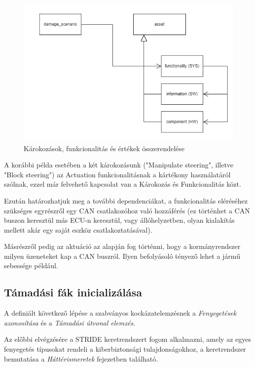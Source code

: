\begin{figure}[!ht]
	\centering
	\includegraphics[width=130mm, keepaspectratio]{figures/04_dependencies.png}
	\caption{Károkozások, funkcionalitás és értékek összerendelése}
	\label{fig:04_dependencies}
\end{figure}

A korábbi példa esetében a két károkozásunk ("Manipulate steering", illetve "Block steering") az Actuation funkcionalitásnak a kártékony használatáról szólnak, ezzel már felvehető kapcsolat van a Károkozás és Funkcionalitás közt. 

Ezután határozhatjuk meg a további dependenciákat, a funkcionalitás eléréséhez szükséges egyrészről egy CAN csatlakozóhoz való hozzáférés (ez történhet a CAN buszon keresztül más ECU-n keresztül, vagy állóhelyzetben, olyan kialakítás mellett akár egy saját eszköz csatlakoztatásával). 

Másrészről pedig az aktuáció az alapján fog történni, hogy a kormányrendszer milyen üzeneteket kap a CAN buszról. Ilyen befolyásoló tényező lehet a jármű sebessége például.

\subsection{Támadási fák inicializálása}

A definiált következő lépése a szabványos kockázatelemzésnek a \textit{Fenyegetések azonosítása} és a \textit{Támadási útvonal elemzés}. 

Az előbbi elvégzésére a STRIDE keretrendszert fogom alkalmazni, amely az egyes fenyegetés típusokat rendeli a kiberbiztonsági tulajdonságokhoz, a keretrendszer bemutatása a \textit{Háttérismeretek} fejezetben található.

